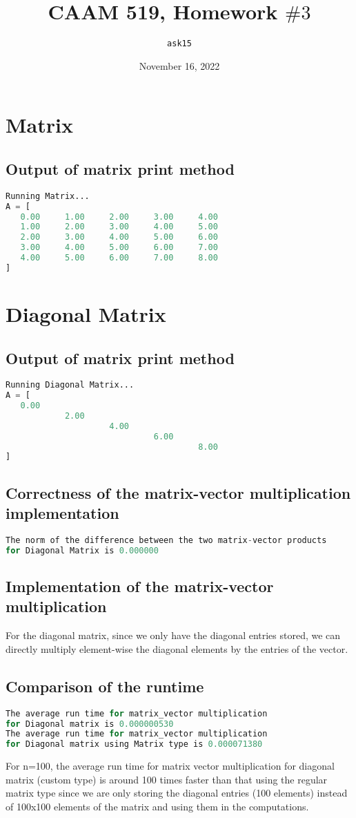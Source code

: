 \documentclass{article}
\title{CAAM 519, Homework $\#3$}
\author{\texttt{ask15}}
\date{November 16, 2022}
\begin{document}
\maketitle

\section{Matrix}
\subsection{Output of matrix print method} 
\begin{lstlisting}[language=awk]
Running Matrix...
A = [
   0.00     1.00     2.00     3.00     4.00
   1.00     2.00     3.00     4.00     5.00
   2.00     3.00     4.00     5.00     6.00
   3.00     4.00     5.00     6.00     7.00
   4.00     5.00     6.00     7.00     8.00
]
\end{lstlisting}
\section{Diagonal Matrix}
\subsection{Output of matrix print method} 
\begin{lstlisting}[language=awk]
Running Diagonal Matrix...
A = [
   0.00
            2.00
                     4.00
                              6.00
                                       8.00
]
\end{lstlisting}
\subsection{Correctness of the matrix-vector multiplication implementation}
\begin{lstlisting}[language=awk]
The norm of the difference between the two matrix-vector products 
for Diagonal Matrix is 0.000000
\end{lstlisting}
\subsection{Implementation of the matrix-vector multiplication}
For the diagonal matrix, since we only have the diagonal entries stored, we can directly multiply element-wise the diagonal elements by the entries of the vector.
\subsection{Comparison of the runtime}
\begin{lstlisting}[language=awk]
The average run time for matrix_vector multiplication 
for Diagonal matrix is 0.000000530
The average run time for matrix_vector multiplication 
for Diagonal matrix using Matrix type is 0.000071380
\end{lstlisting}
For n=100, the average run time for matrix vector multiplication for diagonal matrix (custom type) is around 100 times faster than that using the regular matrix type since we are only storing the diagonal entries (100 elements) instead of 100x100 elements of the matrix and using them in the computations.
\end{document}
